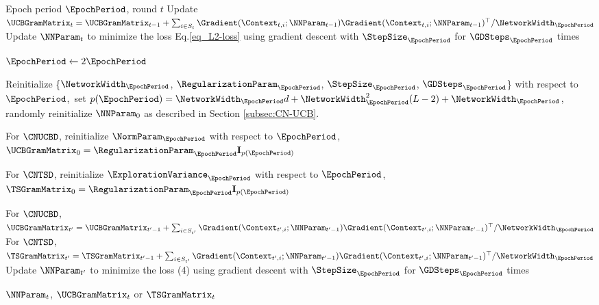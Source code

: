 \documentclass{article}
\theoremstyle{plain}
\begin{document}
\begin{algorithm}[ht]
  \caption{\Update($t, \EpochPeriod$)}
  \label{alg:Update}
\begin{algorithmic}
     Epoch period $\EpochPeriod$, round $t$
    \STATE Update $\UCBGramMatrix_{t} = \UCBGramMatrix_{t-1} + \sum_{i \in S_t} \Gradient(\Context_{t,i}; \NNParam_{t-1})  \Gradient(\Context_{t,i}; \NNParam_{t-1})^\top / \NetworkWidth_{\EpochPeriod}$
    \STATE Update $\NNParam_{t}$ to minimize the loss Eq.\eqref{eq_L2-loss} using gradient descent with $\StepSize_{\EpochPeriod}$ for $\GDSteps_{\EpochPeriod}$ times
    \ELSE
    
    \STATE $\EpochPeriod \xleftarrow{} 2\EpochPeriod$
    
    \STATE Reinitialize \{$\NetworkWidth_{\EpochPeriod}$,
    $\RegularizationParam_{\EpochPeriod}$,
    $\StepSize_{\EpochPeriod}$, 
    $\GDSteps_{\EpochPeriod}$\} with respect to $\EpochPeriod$,\, 
    set $p(\EpochPeriod) = \NetworkWidth_{\EpochPeriod} d + \NetworkWidth_{\EpochPeriod}^{2} (L-2) + \NetworkWidth_{\EpochPeriod}$, \,
    randomly reinitialize $\NNParam_{0}$ as described in Section \ref{subsec:CN-UCB}.
    
    For $\CNUCBD$,
    reinitialize $\NormParam_{\EpochPeriod}$ with respect to $\EpochPeriod$, \,
    $\UCBGramMatrix_{0} = \RegularizationParam_{\EpochPeriod} \mathbf{I}_{p(\EpochPeriod)}$
    
    For $\CNTSD$,
    reinitialize $\ExplorationVariance_{\EpochPeriod}$ with respect to $\EpochPeriod$, \,
    $\TSGramMatrix_{0} = \RegularizationParam_{\EpochPeriod} \mathbf{I}_{p(\EpochPeriod)}$
    

    \STATE For $\CNUCBD$, $ \UCBGramMatrix_{t'} = \UCBGramMatrix_{t'-1} + \sum_{i \in S_{t'}} \Gradient (\Context_{t',i}; \NNParam_{t'-1}) \Gradient(\Context_{t',i};\NNParam_{t'-1})^\top / \NetworkWidth_{\EpochPeriod}$    
    \STATE For $\CNTSD$, $ \TSGramMatrix_{t'} = \TSGramMatrix_{t'-1} + \sum_{i \in S_{t'}} \Gradient (\Context_{t',i}; \NNParam_{t'-1}) \Gradient(\Context_{t',i};\NNParam_{t'-1})^\top / \NetworkWidth_{\EpochPeriod}$    
    \STATE Update $\NNParam_{t'}$ to minimize the loss (4)  using gradient descent with $\StepSize_{\EpochPeriod}$ for $\GDSteps_{\EpochPeriod}$ times
    
    \ENDFOR
    \ENDIF
     $\NNParam_{t}$, $\UCBGramMatrix_{t}$ or $\TSGramMatrix_{t}$
\end{algorithmic}
\end{algorithm}
\end{document}
